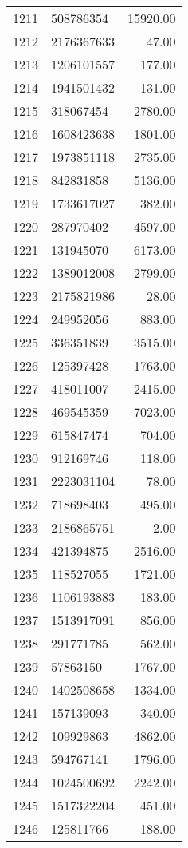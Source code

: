 \begin{table}[ht]
\begin{tabular}{rlr}
  1211 & 508786354 & 15920.00 \\ 
  1212 & 2176367633 & 47.00 \\ 
  1213 & 1206101557 & 177.00 \\ 
  1214 & 1941501432 & 131.00 \\ 
  1215 & 318067454 & 2780.00 \\ 
  1216 & 1608423638 & 1801.00 \\ 
  1217 & 1973851118 & 2735.00 \\ 
  1218 & 842831858 & 5136.00 \\ 
  1219 & 1733617027 & 382.00 \\ 
  1220 & 287970402 & 4597.00 \\ 
  1221 & 131945070 & 6173.00 \\ 
  1222 & 1389012008 & 2799.00 \\ 
  1223 & 2175821986 & 28.00 \\ 
  1224 & 249952056 & 883.00 \\ 
  1225 & 336351839 & 3515.00 \\ 
  1226 & 125397428 & 1763.00 \\ 
  1227 & 418011007 & 2415.00 \\ 
  1228 & 469545359 & 7023.00 \\ 
  1229 & 615847474 & 704.00 \\ 
  1230 & 912169746 & 118.00 \\ 
  1231 & 2223031104 & 78.00 \\ 
  1232 & 718698403 & 495.00 \\ 
  1233 & 2186865751 & 2.00 \\ 
  1234 & 421394875 & 2516.00 \\ 
  1235 & 118527055 & 1721.00 \\ 
  1236 & 1106193883 & 183.00 \\ 
  1237 & 1513917091 & 856.00 \\ 
  1238 & 291771785 & 562.00 \\ 
  1239 & 57863150 & 1767.00 \\ 
  1240 & 1402508658 & 1334.00 \\ 
  1241 & 157139093 & 340.00 \\ 
  1242 & 109929863 & 4862.00 \\ 
  1243 & 594767141 & 1796.00 \\ 
  1244 & 1024500692 & 2242.00 \\ 
  1245 & 1517322204 & 451.00 \\ 
  1246 & 125811766 & 188.00 \\ 

\end{tabular}
\end{table}
